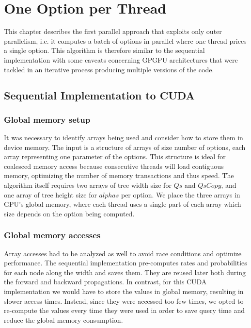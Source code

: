 \chapter{One Option per Thread}
\label{chapter:oneoptionperthread}
This chapter describes the first parallel approach that exploits only outer parallelism, i.e. it computes a batch of options in parallel where one thread prices a single option. 
This algorithm is therefore similar to the sequential implementation with some caveats concerning GPGPU architectures that were tackled in an iterative process producing multiple versions of the code.

\section{Sequential Implementation to CUDA}
\label{section:oneoption:seqtocuda}
\subsection*{Global memory setup}
It was necessary to identify arrays being used and consider how to store them in device memory. The input is a structure of arrays of size number of options, each array representing one parameter of the options. This structure is ideal for coalesced memory access because consecutive threads will load contiguous memory, optimizing the number of memory transactions and thus speed. The algorithm itself requires two arrays of tree width size for $\mathit{Qs}$ and $\mathit{QsCopy}$, and one array of tree height size for $\mathit{alphas}$ per option. We place the three arrays in GPU's global memory, where each thread uses a single part of each array which size depends on the option being computed.

\subsection*{Global memory accesses}
Array accesses had to be analyzed as well to avoid race conditions and optimize performance. The sequential implementation pre-computes rates and probabilities for each node along the width and saves them. They are reused later both during the forward and backward propagations. In contrast, for this CUDA implementation we would have to store the values in global memory, resulting in slower access times. Instead, since they were accessed too few times, we opted to re-compute the values every time they were used in order to save query time and reduce the global memory consumption. 

